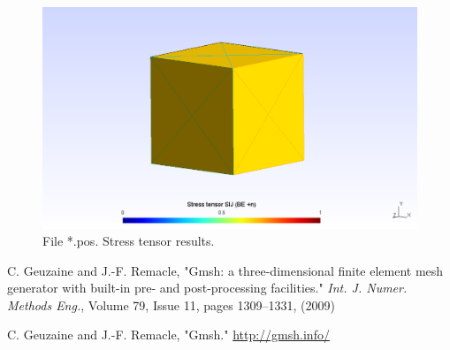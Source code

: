 \documentclass[a4]{article}
\begin{document}
\begin{figure}
	\centering
	\includegraphics[scale = 0.5]{stress.png}
	\caption{File *.pos. Stress tensor results.}
	\label{fig:stress}
\end{figure}

\begin{thebibliography}{99}
	
	 C. Geuzaine and J.-F. Remacle, "Gmsh: a three-dimensional finite element mesh generator with built-in pre- and post-processing facilities." \emph{Int. J. Numer. Methods Eng.}, Volume 79, Issue 11, pages 1309--1331, (2009)
	
	 C. Geuzaine and J.-F. Remacle, "Gmsh." \url{http://gmsh.info/}
	
\end{thebibliography}
\end{document}
